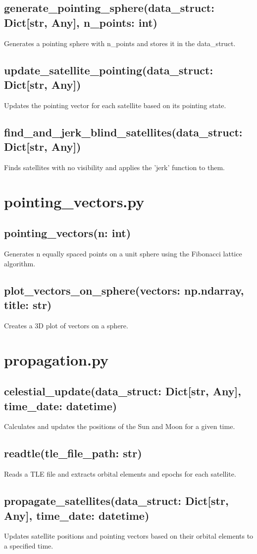 \documentclass{article}
\begin{document}
\subsection*{generate\_pointing\_sphere(data\_struct: Dict[str, Any], n\_points: int)}
Generates a pointing sphere with n\_points and stores it in the data\_struct.
\subsection*{update\_satellite\_pointing(data\_struct: Dict[str, Any])}
Updates the pointing vector for each satellite based on its pointing state.
\subsection*{find\_and\_jerk\_blind\_satellites(data\_struct: Dict[str, Any])}
Finds satellites with no visibility and applies the 'jerk' function to them.

\section*{pointing\_vectors.py}
\subsection*{pointing\_vectors(n: int)}
Generates n equally spaced points on a unit sphere using the Fibonacci lattice algorithm.
\subsection*{plot\_vectors\_on\_sphere(vectors: np.ndarray, title: str)}
Creates a 3D plot of vectors on a sphere.

\section*{propagation.py}
\subsection*{celestial\_update(data\_struct: Dict[str, Any], time\_date: datetime)}
Calculates and updates the positions of the Sun and Moon for a given time.
\subsection*{readtle(tle\_file\_path: str)}
Reads a TLE file and extracts orbital elements and epochs for each satellite.
\subsection*{propagate\_satellites(data\_struct: Dict[str, Any], time\_date: datetime)}
Updates satellite positions and pointing vectors based on their orbital elements to a specified time.
\end{document}
